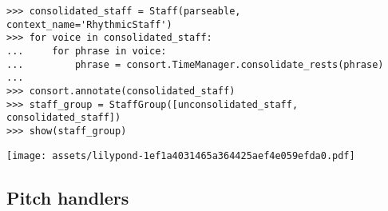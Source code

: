 \begin{comment}
<abjad>
consolidated_staff = Staff(parseable, context_name='RhythmicStaff')
for voice in consolidated_staff:
    for phrase in voice:
        phrase = consort.TimeManager.consolidate_rests(phrase)

consort.annotate(consolidated_staff)
staff_group = StaffGroup([unconsolidated_staff, consolidated_staff])
show(staff_group)
</abjad>
\end{comment}

\begin{singlespacing}
\vspace{-0.5\baselineskip}
\begin{lstlisting}
>>> consolidated_staff = Staff(parseable, context_name='RhythmicStaff')
>>> for voice in consolidated_staff:
...     for phrase in voice:
...         phrase = consort.TimeManager.consolidate_rests(phrase)
...
>>> consort.annotate(consolidated_staff)
>>> staff_group = StaffGroup([unconsolidated_staff, consolidated_staff])
>>> show(staff_group)
\end{lstlisting}
\noindent\texttt{[image: assets/lilypond-1ef1a4031465a364425aef4e059efda0.pdf]}
\end{singlespacing}

\subsection{Pitch handlers}

\begin{comment}
<abjad>[stylesheet=../consort.ily]
segment_maker = consort.SegmentMaker(
    desired_duration_in_seconds=9,
    omit_stylesheets=True,
    permitted_time_signatures=[(3, 4)],
    score_template=templatetools.GroupedStavesScoreTemplate(
        staff_count=2,
        ),
    tempo=indicatortools.Tempo((1, 4), 60),
    )
music_specifier = consort.MusicSpecifier(
    rhythm_maker=rhythmmakertools.TaleaRhythmMaker(
        talea=rhythmmakertools.Talea([1], 16),
        ),
    )
timespan_maker = consort.TaleaTimespanMaker(
    initial_silence_talea=rhythmmakertools.Talea([0, 1], 4),
    playing_talea=rhythmmakertools.Talea([1], 8),
    playing_groupings=[3],
    silence_talea=rhythmmakertools.Talea([1], 8),
    )
segment_maker.add_setting(
    timespan_maker=timespan_maker,
    v1=music_specifier,
    v2=music_specifier,
    )
show(segment_maker, verbose=False)
</abjad>
\end{comment}

